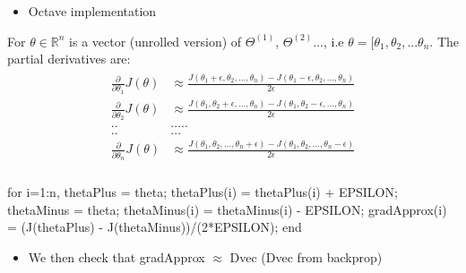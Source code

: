 \documentclass[a4paper,12pt]{report}
\begin{document}
\begin{itemize}
\item Octave implementation
\end{itemize}
For $\theta \in  \mathbb{R}^n$ is a vector (unrolled version) of $\Theta^{(1)}$, $\Theta^{(2)}$..., i.e $\theta = [\theta_1, \theta_2,...\theta_n$.
The partial derivatives are:
\begin{align}
\begin{split}
\frac{\partial }{\partial \theta_1} J(\theta) & \approx \frac{J(\theta_1+\epsilon, \theta_2, ..., \theta_n) - J(\theta_1-\epsilon, \theta_2, ..., \theta_n)}{2 \epsilon} \\
\frac{\partial }{\partial \theta_2} J(\theta) & \approx \frac{J(\theta_1, \theta_2+\epsilon, ..., \theta_n) - J(\theta_1, \theta_2-\epsilon, ..., \theta_n)}{2 \epsilon} \\
.. & ..... \\
.. & ... \\
\frac{\partial }{\partial \theta_n} J(\theta) & \approx \frac{J(\theta_1, \theta_2, ..., \theta_n+\epsilon) - J(\theta_1, \theta_2, ..., \theta_n-\epsilon)}{2 \epsilon} \\
\end{split}
\end{align}
\begin{tcolorbox}
\begin{python}
for i=1:n,
	thetaPlus = theta;
	thetaPlus(i) = thetaPlus(i) + EPSILON;
	thetaMinus = theta;
	thetaMinus(i) = thetaMinus(i) - EPSILON;
	gradApprox(i) = (J(thetaPlus) - J(thetaMinus))/(2*EPSILON);
end
\end{python}
\end{tcolorbox}

\begin{itemize}
\item We then check that gradApprox $\approx$ Dvec (Dvec from backprop)
\end{itemize}
\end{document}

